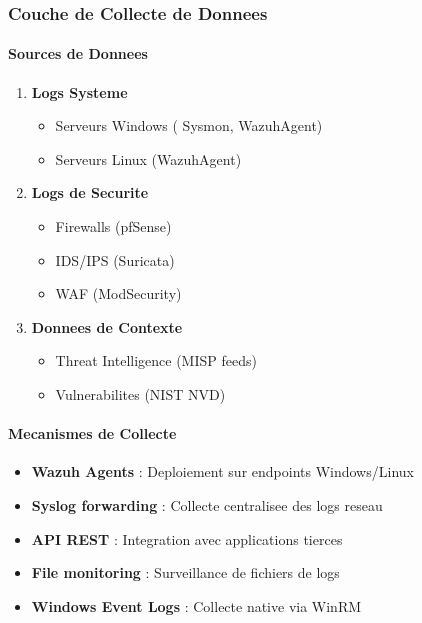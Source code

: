 \subsubsection{Couche de Collecte de Donnees}

\paragraph{Sources de Donnees}
\begin{enumerate}
    \item \textbf{Logs Systeme}
          \begin{itemize}
              \item Serveurs Windows ( Sysmon, WazuhAgent)
              \item Serveurs Linux (WazuhAgent)
          \end{itemize}


    \item \textbf{Logs de Securite}
          \begin{itemize}
              \item Firewalls (pfSense)
              \item IDS/IPS (Suricata)
              \item WAF (ModSecurity)
          \end{itemize}

    \item \textbf{Donnees de Contexte}
          \begin{itemize}
              \item Threat Intelligence (MISP feeds)
              \item Vulnerabilites (NIST NVD)
          \end{itemize}
\end{enumerate}

\paragraph{Mecanismes de Collecte}
\begin{itemize}
    \item \textbf{Wazuh Agents} : Deploiement sur endpoints Windows/Linux
    \item \textbf{Syslog forwarding} : Collecte centralisee des logs reseau
    \item \textbf{API REST} : Integration avec applications tierces
    \item \textbf{File monitoring} : Surveillance de fichiers de logs
    \item \textbf{Windows Event Logs} : Collecte native via WinRM
\end{itemize}

